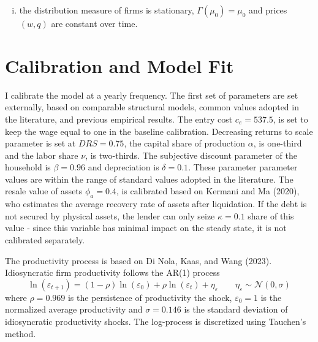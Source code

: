\documentclass[12pt]{article}
\begin{document}
\begin{enumerate}[(i)]
\begin{multline*}
\end{multline*}
$\Psi$ collects fixed operating and entry costs, as well as default resolution costs, including the deadweight loss from liquidating capital, the costs of debt renegotiation in reorganization, and the loss of current revenues upon default
\begin{multline*} 
\Psi = \int c \, d\mu_0(k,b,\varepsilon) 
+ M \int (1 - \chi_{ex}) \, c_e \, d\Phi(\varepsilon) 
+ \int \chi_d  \chi_l \, \pi(k,\varepsilon) \, d\mu_0(k,b,\varepsilon) \\ 
+ \int \chi_d \, \chi_l \, (1 - \phi_a)(1 - \delta)k \, d\mu_0(k,b,\varepsilon) \\
+ \int \chi_d \, (1 - \chi_l) \left[ \gamma V_{cont}(x,\varepsilon) + \zeta \right] \, d\mu_0(k,b,\varepsilon)
\end{multline*}

\item the distribution measure of firms is stationary, $\Gamma(\mu_0) = \mu_0$ and prices $(w,q)$ are constant over time.
\end{enumerate}


\section{Calibration and Model Fit}
I calibrate the model at a yearly frequency. The first set of parameters are set externally, based on comparable structural models, common values adopted in the literature, and previous empirical results. The entry cost $c_e = 537.5$, is set to keep the wage equal to one in the baseline calibration. Decreasing returns to scale parameter is set at $DRS = 0.75$, the capital share of production $\alpha$, is one-third and the labor share $\nu$, is two-thirds. The subjective discount parameter of the household is $\beta = 0.96$ and depreciation is $\delta = 0.1$. These parameter parameter values are within the range of standard values adopted in the literature. The resale value of assets $\phi_a = 0.4$, is calibrated based on Kermani and Ma (2020), who estimates the average recovery rate of assets after liquidation. If the debt is not secured by physical assets, the lender can only seize $\kappa = 0.1$ share of this value - since this variable has minimal impact on the steady state, it is not calibrated separately. 

The productivity process is based on Di Nola, Kaas, and Wang (2023). Idiosyncratic firm productivity follows the AR(1) process 
$$ \ln(\varepsilon_{t+1}) = (1-\rho) \ln(\varepsilon_0) + \rho \ln(\varepsilon_t) + \eta_\varepsilon \qquad \eta_\varepsilon \sim \mathcal{N}(0,\sigma)$$ where 
$\rho = 0.969$ is the persistence of productivity the shock, $\varepsilon_0 = 1$ is the normalized average productivity and $\sigma = 0.146$ is the standard deviation of idiosyncratic productivity shocks. The log-process is discretized using Tauchen's method. 
\end{document}
